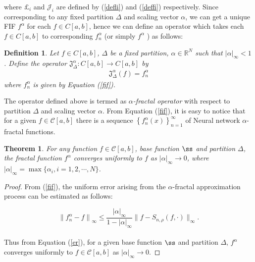 \documentclass{article}[12pt, a4]
\newtheorem{theorem}{\large Theorem}[section]
\newtheorem{definition}{\large Definition}[section]
\begin{document}
	
	where $\pounds_i$ and $\mathcal{J}_{i}$ are defined by (\ref{defli}) and (\ref{deffi}) respectively. Since corresponding to any fixed partition $\Delta$ and scaling vector $\alpha$, we can get a unique  FIF $f^{\alpha}$ for each $f \in C[a,b]$, hence we can define an operator which takes each $f \in C[a,b]$ to corresponding $f^{\alpha}_{n}$ (or simply $f^{\alpha}$ ) as follows: \\
	\begin{definition}
		Let $f \in C[a,b]$, $\Delta$ be a fixed partition, $\alpha \in \mathbb{R}^N$ such that $|\alpha|_{\infty} <1$. Define the operator $\mathfrak{J}_{\Delta}^{\alpha}:C[a,b]\rightarrow C[a,b]$ by 
		\begin{align*}
			\mathfrak{J}_{\Delta}^{\alpha}(f)= f^{\alpha}_{n}
		\end{align*}
		where $f^{\alpha}_{n}$ is given by Equation (\ref{fif}).
		
	\end{definition}
	The operator defined above is termed as \textit{$\alpha$-fractal operator} with respect to partition $\Delta$ and scaling vector $\alpha$.
	From Equation (\ref{fif}), it is easy to notice that for a given $f \in \mathcal{C}[a,b]$ there is a sequence $\left\{f_{n}^{\alpha}(x)\right\}_{n=1}^{\infty}$ of Neural network $\alpha$-fractal functions.\\
	
	\begin{theorem}\label{Thm31}
		For any function $f\in\mathcal{C}[a,b]$, base function $\ss$ and partition $ \Delta$, the fractal function $f^\alpha$ converges uniformly to $f$ as $|\alpha|_\infty \to 0$, where $|\alpha|_\infty =\max \{\alpha_{i}, i=1,2,\cdots, N\}$.
		
	\end{theorem}
	
	\begin{proof}
		From (\ref{fif}), the uniform error arising from the $\alpha$-fractal approximation process can be estimated as follows:
		
		
		\begin{equation}\label{er}
			\left\|f^{\alpha}_{n}-f\right\|_{\infty} \leq \frac{|\alpha|_{\infty}}{1-|\alpha|_{\infty}}\|f-S_{n,\rho}(f, \cdot)\|_{\infty} .
		\end{equation}\\
		Thus from Equation (\ref{er}), for a given base function $\ss$ and partition \( \Delta \), \( f^\alpha \) converges uniformly to \( f \in \mathcal{C}[a, b] \) as \( |\alpha|_\infty \to 0 \).
	\end{proof}
	
\end{document}
